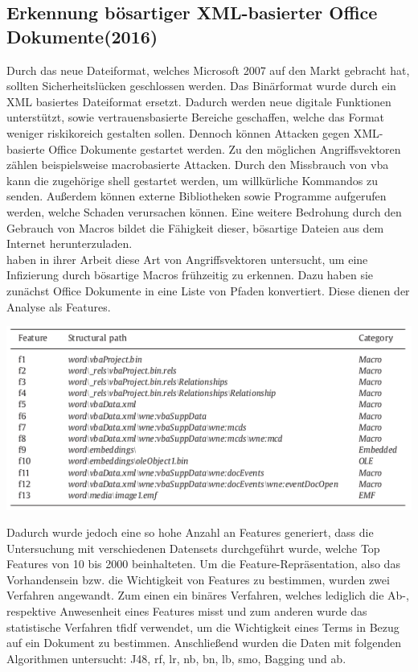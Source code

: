 \documentclass[
    12pt, %
    DIV10,
    ngerman, %
    a4paper, %
    oneside, %
    titlepage, %
    parskip=half, %
    headings=normal, %
    listof=totoc, %
    bibliography=totoc, %
    index=totoc, %
    captions=tableheading, %
    final %
]{scrreprt}
\begin{document}
\subsection{Erkennung bösartiger XML-basierter Office Dokumente(2016)}
Durch das neue Dateiformat, welches Microsoft 2007 auf den Markt gebracht hat, sollten Sicherheitslücken geschlossen werden.
Das Binärformat wurde durch ein	XML basiertes Dateiformat ersetzt. Dadurch werden neue digitale Funktionen unterstützt, sowie vertrauensbasierte Bereiche geschaffen, welche das Format weniger riskikoreich gestalten sollen. Dennoch können Attacken gegen XML-basierte Office Dokumente gestartet werden. Zu den möglichen Angriffsvektoren zählen beispielsweise macrobasierte Attacken. Durch den Missbrauch von \ac{vba} kann die zugehörige shell gestartet werden, um willkürliche Kommandos zu senden. Außerdem können externe Bibliotheken sowie Programme aufgerufen werden, welche Schaden verursachen können. Eine weitere Bedrohung durch den Gebrauch von Macros bildet die Fähigkeit dieser, bösartige Dateien aus dem Internet herunterzuladen.\\
\textcite{Cohen2016} haben in ihrer Arbeit diese Art von Angriffsvektoren untersucht, um eine Infizierung durch bösartige Macros frühzeitig zu erkennen. Dazu haben sie zunächst Office Dokumente in eine Liste von Pfaden konvertiert. Diese dienen der Analyse als Features.
\begin{center}
\includegraphics[scale=0.6]{img/pfade.png}
\label{fig:pe}
\end{center}
Dadurch wurde jedoch eine so hohe Anzahl an Features generiert, dass die Untersuchung mit verschiedenen Datensets durchgeführt wurde, welche Top Features von 10 bis 2000 beinhalteten. Um die Feature-Repräsentation, also das Vorhandensein bzw. die Wichtigkeit von Features zu bestimmen, wurden zwei Verfahren angewandt. Zum einen ein binäres Verfahren, welches lediglich die Ab-, respektive Anwesenheit eines Features misst und zum anderen wurde das statistische Verfahren \ac{tfidf} verwendet, um die Wichtigkeit eines Terms in Bezug auf ein Dokument zu bestimmen. Anschließend wurden die Daten mit folgenden Algorithmen untersucht: J48, \ac{rf}, \ac{lr}, \ac{nb}, \ac{bn}, \ac{lb}, \ac{smo}, Bagging und \ac{ab}. \\\\
\end{document}
